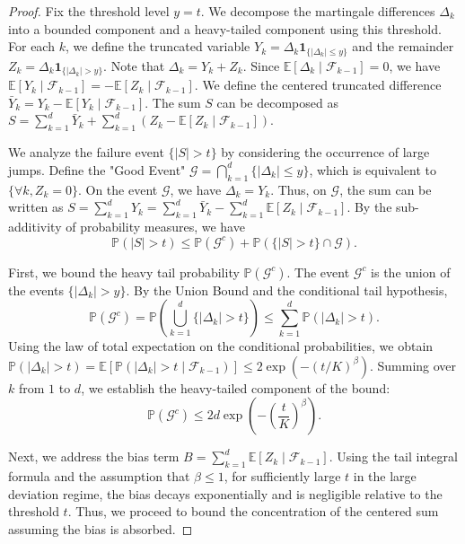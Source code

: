 \documentclass[11pt]{amsart}
\theoremstyle{definition}
\theoremstyle{remark}
\begin{document}
\begin{proof}
Fix the threshold level $y = t$. We decompose the martingale differences $\Delta_k$ into a bounded component and a heavy-tailed component using this threshold. For each $k$, we define the truncated variable $Y_k = \Delta_k \mathbf{1}_{\{|\Delta_k| \le y\}}$ and the remainder $Z_k = \Delta_k \mathbf{1}_{\{|\Delta_k| > y\}}$. Note that $\Delta_k = Y_k + Z_k$. Since $\mathbb{E}[\Delta_k \mid \mathcal{F}_{k-1}] = 0$, we have $\mathbb{E}[Y_k \mid \mathcal{F}_{k-1}] = - \mathbb{E}[Z_k \mid \mathcal{F}_{k-1}]$. We define the centered truncated difference $\bar{Y}_k = Y_k - \mathbb{E}[Y_k \mid \mathcal{F}_{k-1}]$. The sum $S$ can be decomposed as $S = \sum_{k=1}^d \bar{Y}_k + \sum_{k=1}^d ( Z_k - \mathbb{E}[Z_k \mid \mathcal{F}_{k-1}] )$.

We analyze the failure event $\{|S| > t\}$ by considering the occurrence of large jumps. Define the "Good Event" $\mathcal{G} = \bigcap_{k=1}^d \{ |\Delta_k| \le y \}$, which is equivalent to $\{ \forall k, Z_k = 0 \}$. On the event $\mathcal{G}$, we have $\Delta_k = Y_k$. Thus, on $\mathcal{G}$, the sum can be written as $S = \sum_{k=1}^d Y_k = \sum_{k=1}^d \bar{Y}_k - \sum_{k=1}^d \mathbb{E}[Z_k \mid \mathcal{F}_{k-1}]$. By the sub-additivity of probability measures, we have
\begin{equation}
\mathbb{P}(|S| > t) \le \mathbb{P}(\mathcal{G}^c) + \mathbb{P}(\{|S| > t\} \cap \mathcal{G}).
\end{equation}

First, we bound the heavy tail probability $\mathbb{P}(\mathcal{G}^c)$. The event $\mathcal{G}^c$ is the union of the events $\{|\Delta_k| > y\}$. By the Union Bound and the conditional tail hypothesis,
\begin{equation}
\mathbb{P}(\mathcal{G}^c) = \mathbb{P}\left( \bigcup_{k=1}^d \{|\Delta_k| > t\} \right) \le \sum_{k=1}^d \mathbb{P}(|\Delta_k| > t).
\end{equation}
Using the law of total expectation on the conditional probabilities, we obtain $\mathbb{P}(|\Delta_k| > t) = \mathbb{E}[ \mathbb{P}(|\Delta_k| > t \mid \mathcal{F}_{k-1}) ] \le 2 \exp( - (t/K)^\beta )$. Summing over $k$ from $1$ to $d$, we establish the heavy-tailed component of the bound:
\begin{equation}
\mathbb{P}(\mathcal{G}^c) \le 2d \exp\left( - \left(\frac{t}{K}\right)^\beta \right).
\end{equation}

Next, we address the bias term $B = \sum_{k=1}^d \mathbb{E}[Z_k \mid \mathcal{F}_{k-1}]$. Using the tail integral formula and the assumption that $\beta \le 1$, for sufficiently large $t$ in the large deviation regime, the bias decays exponentially and is negligible relative to the threshold $t$. Thus, we proceed to bound the concentration of the centered sum assuming the bias is absorbed.


\end{proof}
\end{document}
